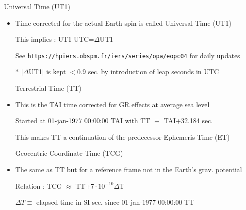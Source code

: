 \Tr
\begin{center}
{\red Universal Time (UT1)}
\end{center}
%
\begin{itemize}
\item Time corrected for the actual Earth spin is called {\blue Universal Time (UT1)} 
\item[] This implies : {\blue UT1-UTC=$\Delta$UT1}
\item[] See {\tt https://hpiers.obspm.fr/iers/series/opa/eopc04} for daily updates
\item[$\ast$] $|\Delta$UT1$|$ is kept $<0.9$ sec. by introduction of leap seconds in UTC
\end{itemize}
%
\begin{itemize}
\item[] \begin{center}{\red Terrestrial Time (TT)}\end{center}
\item This is the TAI time corrected for GR effects at average sea level
\item[] Started at 01-jan-1977 00:00:00 TAI with {\blue TT $\equiv$ TAI+32.184 sec.}
\item[] This makes TT a continuation of the predecessor Ephemeris Time (ET)
\end{itemize}
%
\begin{itemize}
\item[] \begin{center}{\red Geocentric Coordinate Time (TCG)}\end{center}
\item The same as TT but for a reference frame not in the Earth's grav. potential
\item[] Relation : {\blue TCG $\approx$ TT+$7 \cdot 10^{-10} \Delta$T}
\item[] $\Delta T \equiv$ elapsed time in SI sec. since 01-jan-1977 00:00:00 TT
\end{itemize}

